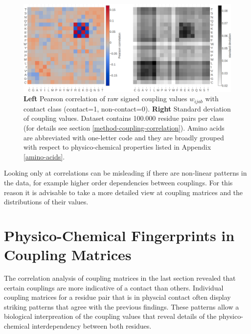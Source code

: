 \documentclass[12pt,a4paper,twoside]{book}
\newcommand{\wijab}{w_{ijab}}
\theoremstyle{definition}
\theoremstyle{definition}
\theoremstyle{remark}
\begin{document}
\begin{figure}
\includegraphics[width=1\linewidth]{img/coupling_matrix_analysis/combi_couplings_correlation_and_stddev_heatmap_notitle} \caption{\textbf{Left} Pearson correlation of
raw signed coupling values \(\wijab\) with contact class (contact=1,
non-contact=0). \textbf{Right} Standard deviation of coupling values.
Dataset contains 100.000 residue pairs per class (for details see
section \ref{method-coupling-correlation}). Amino acids are abbreviated
with one-letter code and they are broadly grouped with respect to
physico-chemical properties listed in Appendix \ref{amino-acids}.}\label{fig:coupling-correlation}
\end{figure}

Looking only at correlations can be misleading if there are non-linear
patterns in the data, for example higher order dependencies between
couplings. For this reason it is advisable to take a more detailed view
at coupling matrices and the distributions of their values.

\section{Physico-Chemical Fingerprints in Coupling
Matrices}\label{physico-chemical-fingerprints-in-coupling-matrices}

The correlation analysis of coupling matrices in the last section
revealed that certain couplings are more indicative of a contact than
others. Individual coupling matrices for a residue pair that is in
physcial contact often display striking patterns that agree with the
previous findings. These patterns allow a biological interpreation of
the coupling values that reveal details of the physico-chemical
interdependency between both residues.
\end{document}
